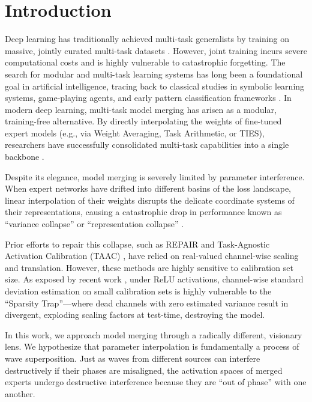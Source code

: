 \documentclass{article}
\begin{document}
\section{Introduction}
\label{submission:intro}
Deep learning has traditionally achieved multi-task generalists by training on massive, jointly curated multi-task datasets \cite{vaswani2017attention}. However, joint training incurs severe computational costs and is highly vulnerable to catastrophic forgetting. The search for modular and multi-task learning systems has long been a foundational goal in artificial intelligence, tracing back to classical studies in symbolic learning systems, game-playing agents, and early pattern classification frameworks \cite{Samuel59, Newell81, mitchell80, MachineLearningI, DudaHart2nd, kearns89, langley00}. In modern deep learning, multi-task model merging has arisen as a modular, training-free alternative. By directly interpolating the weights of fine-tuned expert models (e.g., via Weight Averaging, Task Arithmetic, or TIES), researchers have successfully consolidated multi-task capabilities into a single backbone \cite{yadav2023ties, ilharco2023editing}.

Despite its elegance, model merging is severely limited by parameter interference. When expert networks have drifted into different basins of the loss landscape, linear interpolation of their weights disrupts the delicate coordinate systems of their representations, causing a catastrophic drop in performance known as ``variance collapse'' or ``representation collapse'' \cite{jordan2023repair, taac2026}. 

Prior efforts to repair this collapse, such as REPAIR \cite{jordan2023repair} and Task-Agnostic Activation Calibration (TAAC) \cite{taac2026}, have relied on real-valued channel-wise scaling and translation. However, these methods are highly sensitive to calibration set size. As exposed by recent work \cite{sp_taac2026}, under ReLU activations, channel-wise standard deviation estimation on small calibration sets is highly vulnerable to the ``Sparsity Trap''---where dead channels with zero estimated variance result in divergent, exploding scaling factors at test-time, destroying the model.

In this work, we approach model merging through a radically different, visionary lens. We hypothesize that parameter interpolation is fundamentally a process of wave superposition. Just as waves from different sources can interfere destructively if their phases are misaligned, the activation spaces of merged experts undergo destructive interference because they are ``out of phase'' with one another. 
\end{document}

